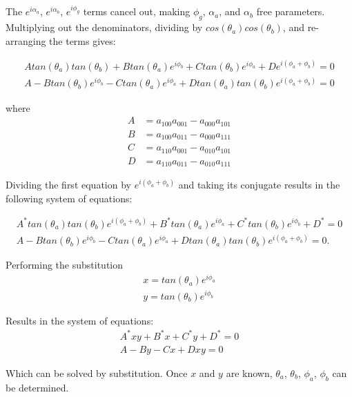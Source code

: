 The $e^{i\alpha_a}$, $e^{i\alpha_b}$, $e^{i\phi_g}$ terms cancel out,
making $\phi_g$, $\alpha_a$, and $\alpha_b$ free parameters. Multiplying out
the denominators, dividing by $cos(\theta_a)cos(\theta_b)$, and re-arranging the
terms gives:

\begin{align}
Atan(\theta_a)tan(\theta_b) + Btan(\theta_a)e^{i\phi_b} + Ctan(\theta_b)e^{i\phi_a} + De^{i(\phi_a + \phi_b)} = 0 \nonumber \\
A - Btan(\theta_b)e^{i\phi_b} - Ctan(\theta_a)e^{i\phi_a} + Dtan(\theta_a)tan(\theta_b)e^{i(\phi_a + \phi_b)} = 0
\end{align}

where
\begin{align}
A &= a_{100}a_{001} - a_{000}a_{101}\nonumber \\
B &= a_{100}a_{011} - a_{000}a_{111}\nonumber \\
C &= a_{110}a_{001} - a_{010}a_{101}\nonumber \\
D &= a_{110}a_{011} - a_{010}a_{111}
\end{align}

Dividing the first equation by $e^{i(\phi_a + \phi_b)}$ and taking its conjugate
results in the following system of equations:

\begin{align}
A^*tan(\theta_a)tan(\theta_b)e^{i(\phi_a + \phi_b)} + B^*tan(\theta_a)e^{i\phi_a} + C^*tan(\theta_b)e^{i\phi_b} + D^* = 0 \nonumber \\
A - Btan(\theta_b)e^{i\phi_b} - Ctan(\theta_a)e^{i\phi_a} + Dtan(\theta_a)tan(\theta_b)e^{i(\phi_a + \phi_b)} = 0.
\end{align}

Performing the substitution
\begin{align}
x = tan(\theta_a)e^{i\phi_a} \nonumber \\
y = tan(\theta_b)e^{i\phi_b}
\end{align}

Results in the system of equations:
\begin{align}
A^*xy + B^*x + C^*y + D^* = 0 \nonumber \\
A - By - Cx + Dxy = 0
\end{align}

Which can be solved by substitution. Once $x$ and $y$ are known,
$\theta_a$, $\theta_b$, $\phi_a$, $\phi_b$ can be determined.

